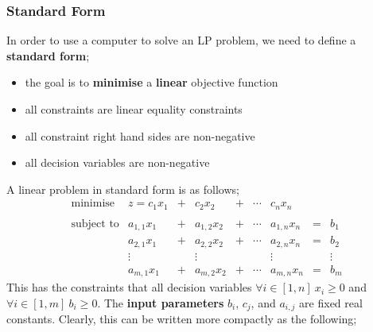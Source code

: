 \documentclass[a4paper, 12pt]{article}
\begin{document}
            \subsubsection*{Standard Form}
                In order to use a computer to solve an LP problem, we need to define a \textbf{standard form};
                \begin{itemize}
                    \itemsep0em
                    \item the goal is to \textbf{minimise} a \textbf{linear} objective function
                    \item all constraints are linear equality constraints
                    \item all constraint right hand sides are non-negative
                    \item all decision variables are non-negative
                \end{itemize}
                A linear problem in standard form is as follows;
                $$\begin{matrix}
                    \text{minimise} & z = c_1 x_1 & + & c_2 x_2 & + & \cdots & c_n x_n \\ \\
                    \text{subject to} & a_{1, 1} x_1 & + & a_{1, 2} x_2 & + & \cdots & a_{1, n} x_n & = & b_1 \\
                    & a_{2, 1} x_1 & + & a_{2, 2} x_2 & + & \cdots & a_{2, n} x_n & = & b_2 \\
                    & \vdots & & \vdots & & & \vdots & & \vdots \\
                    & a_{m, 1} x_1 & + & a_{m, 2} x_2 & + & \cdots & a_{m, n} x_n & = & b_m
                \end{matrix}$$
                This has the constraints that all decision variables $\forall i \in [1, n]\ x_i \geq 0$ and $\forall i \in [1, m]\ b_i \geq 0$.
                The \textbf{input parameters} $b_i$, $c_j$, and $a_{i, j}$ are fixed real constants.
                Clearly, this can be written more compactly as the following;
\end{document}
